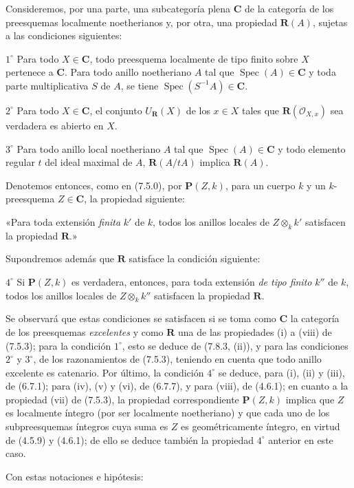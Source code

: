 \begin{env}[7.9.7]
\label{IV.2.s7.9.7-fr}
Consideremos, por una parte, una subcategoría plena $\boldsymbol{C}$ de la categoría
de los preesquemas localmente noetherianos y, por otra, una propiedad
$\boldsymbol R(A)$, sujetas a las condiciones siguientes:

$1^\circ$ Para todo $X\in\boldsymbol{C}$, todo preesquema localmente de tipo finito
sobre $X$ pertenece a $\boldsymbol{C}$. Para todo anillo noetheriano $A$ tal que
$\operatorname{Spec}(A)\in\boldsymbol{C}$ y toda parte multiplicativa $S$ de
$A$, se tiene $\operatorname{Spec}(S^{-1}A)\in\boldsymbol{C}$.

$2^\circ$ Para todo $X\in\boldsymbol{C}$, el conjunto
$U_{\mathbf{R}}(X)$ de los $x\in X$ tales que
$\boldsymbol R(\mathcal O_{X,x})$ sea verdadera es abierto en $X$.

$3^\circ$ Para todo anillo local noetheriano $A$ tal que
$\operatorname{Spec}(A)\in\boldsymbol{C}$ y todo elemento regular $t$ del ideal
maximal de $A$, $\boldsymbol R(A/tA)$ implica $\boldsymbol R(A)$.

Denotemos entonces, como en (7.5.0), por $\boldsymbol P(Z,k)$, para un cuerpo $k$
y un $k$-preesquema $Z\in\boldsymbol{C}$, la propiedad siguiente:


«Para toda extensión \emph{finita} $k'$ de $k$, todos los anillos locales de
$Z\otimes_k k'$ satisfacen la propiedad $\boldsymbol R$.»

Supondremos además que $\boldsymbol R$ satisface la condición siguiente:

$4^\circ$ Si $\boldsymbol P(Z,k)$ es verdadera, entonces, para toda extensión
\emph{de tipo finito} $k''$ de $k$, todos los anillos locales de
$Z\otimes_k k''$ satisfacen la propiedad $\boldsymbol R$.

Se observará que estas condiciones se satisfacen si se toma como
$\boldsymbol{C}$ la categoría de los preesquemas \emph{excelentes} y como
$\boldsymbol R$ una de las propiedades (i) a (viii) de (7.5.3); para la condición
$1^\circ$, esto se deduce de (7.8.3, (ii)), y para las condiciones $2^\circ$ y
$3^\circ$, de los razonamientos de (7.5.3), teniendo en cuenta que todo anillo
excelente es catenario. Por último, la condición $4^\circ$ se deduce,
para (i), (ii) y (iii), de (6.7.1); para (iv), (v) y (vi), de (6.7.7), y para
(viii), de (4.6.1); en cuanto a la propiedad (vii) de (7.5.3),
la propiedad correspondiente $\boldsymbol P(Z,k)$ implica que $Z$ es localmente
íntegro (por ser localmente noetheriano) y que cada uno de los subpreesquemas
íntegros cuya suma es $Z$ es geométricamente íntegro, en virtud de (4.5.9)
y (4.6.1); de ello se deduce también la propiedad $4^\circ$ anterior en este caso.

Con estas notaciones e hipótesis:
\end{env}

